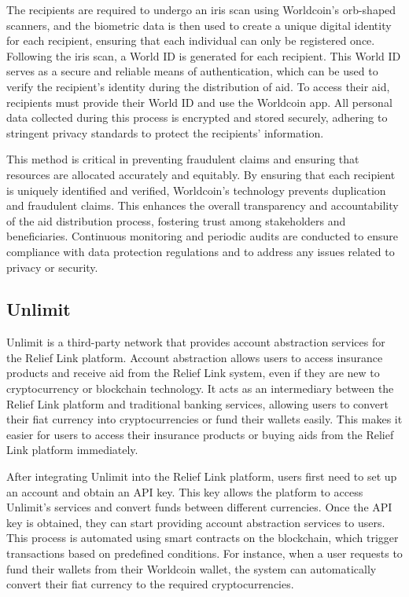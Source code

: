 \documentclass[conference]{IEEEtran}
\begin{document}
The recipients are required to undergo an iris scan using Worldcoin's orb-shaped scanners, and the biometric data is then used to create a unique digital identity for each recipient, ensuring that each individual can only be registered once. Following the iris scan, a World ID is generated for each recipient. This World ID serves as a secure and reliable means of authentication, which can be used to verify the recipient's identity during the distribution of aid. To access their aid, recipients must provide their World ID and use the Worldcoin app. All personal data collected during this process is encrypted and stored securely, adhering to stringent privacy standards to protect the recipients' information.

This method is critical in preventing fraudulent claims and ensuring that resources are allocated accurately and equitably. By ensuring that each recipient is uniquely identified and verified, Worldcoin's technology prevents duplication and fraudulent claims. This enhances the overall transparency and accountability of the aid distribution process, fostering trust among stakeholders and beneficiaries. Continuous monitoring and periodic audits are conducted to ensure compliance with data protection regulations and to address any issues related to privacy or security.

\subsection{Unlimit}
Unlimit is a third-party network that provides account abstraction services for the Relief Link platform. Account abstraction allows users to access insurance products and receive aid from the Relief Link system, even if they are new to cryptocurrency or blockchain technology. It acts as an intermediary between the Relief Link platform and traditional banking services, allowing users to convert their fiat currency into cryptocurrencies or fund their wallets easily. This makes it easier for users to access their insurance products or buying aids from the Relief Link platform immediately.

After integrating Unlimit into the Relief Link platform, users first need to set up an account and obtain an API key. This key allows the platform to access Unlimit's services and convert funds between different currencies. Once the API key is obtained, they can start providing account abstraction services to users. This process is automated using smart contracts on the blockchain, which trigger transactions based on predefined conditions. For instance, when a user requests to fund their wallets from their Worldcoin wallet, the system can automatically convert their fiat currency to the required cryptocurrencies.
\end{document}

